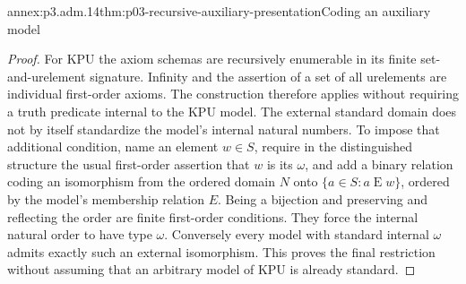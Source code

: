 \begin{annexitem}{annex:p3.adm.14}{thm:p03-recursive-auxiliary-presentation}{Coding an auxiliary model}
\begin{proof}
For KPU the axiom schemas are recursively enumerable in its finite
set-and-urelement signature. Infinity and the assertion of a set of all
urelements are individual first-order axioms. The construction therefore
applies without requiring a truth predicate internal to the KPU model.
The external standard domain does not by itself standardize the model's
internal natural numbers. To impose that additional condition, name
an element \(w\in S\), require in the distinguished structure the
usual first-order assertion that \(w\) is its \(\omega\), and add a
binary relation coding an isomorphism from the ordered domain \(N\)
onto \(\{a\in S:a\mathrel{E}w\}\), ordered by the model's membership
relation \(E\). Being a bijection and preserving and reflecting the
order are finite first-order conditions. They force the internal
natural order to have type \(\omega\). Conversely every model with
standard internal \(\omega\) admits exactly such an external
isomorphism. This proves the final restriction without assuming that
an arbitrary model of KPU is already standard.
\end{proof}
\end{annexitem}
